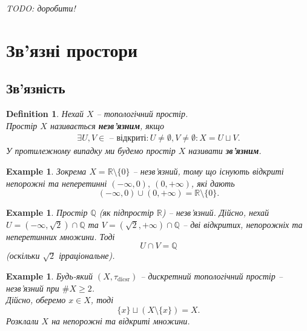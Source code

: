 \documentclass[a4paper, 10pt]{article}
\theoremstyle{theoremdd}
\newtheorem{definition}[theorem]{Definition}
\newtheorem{example}[theorem]{Example}
\begin{document}
\textit{TODO: доробити!}
\newpage

\section{Зв'язні простори}
\subsection{Зв'язність}

\begin{definition}
Нехай $X$ -- топологічний простір.\\
Простір $X$ називається \textbf{незв'язним}, якщо
\begin{align*}
\exists U,V \in \text{ -- відкриті}: U \neq \emptyset, V \neq \emptyset: X = U \sqcup V.
\end{align*}
У протилежному випадку ми будемо простір $X$ називати \textbf{зв'язним}.
\end{definition}

\begin{example}
Зокрема $X = \mathbb{R} \setminus \{0\}$ -- незв'язний, тому що існують відкриті непорожні та неперетинні $(-\infty,0),\ (0,+\infty)$, які дають \[
(-\infty,0) \cup (0,+\infty) = \mathbb{R} \setminus \{0\}.
\]
\end{example}

\begin{example}
Простір $\mathbb{Q}$ (як підпростір $\mathbb{R}$) -- незв'язний. Дійсно, нехай $U = (-\infty,\sqrt{2}) \cap \mathbb{Q}$ та $V = (\sqrt{2},+\infty) \cap \mathbb{Q}$ -- дві відкритих, непорожніх та неперетинних множини. Тоді \[
U \cap V = \mathbb{Q}
\] (оскільки $\sqrt{2}$ ірраціональне).
\end{example}

\begin{example}
Будь-який $(X,\tau_{\text{dicsr}})$ -- дискретний топологічний простір -- незв'язний при $\# X \geq 2$.\\
Дійсно, оберемо $x \in X$, тоді \[
\{x\} \sqcup (X \setminus \{x\}) = X.
\]
Розклали $X$ на непорожні та відкриті множини.
\end{example}
\end{document}
